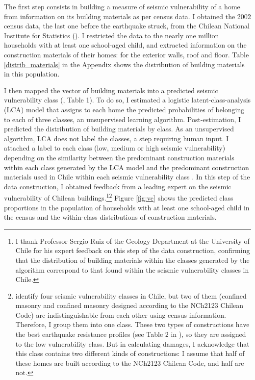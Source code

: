  

The first step consists in building a measure of seismic vulnerability of a home from information on its building materials as per census data. I obtained the 2002 census data, the last one before the earthquake struck, from the Chilean National Institute for Statistics (\cite{ine_censo_2002}). I restricted the data to the nearly one million households with at least one school-aged child, and extracted information on the construction materials of their homes: for the exterior walls, roof and floor. Table \ref{distrib_materials} in the Appendix shows the distribution of building materials in this population.\par 
 I then mapped the vector of building materials into a predicted seismic vulnerability class (\cite{grunthal1998european}, Table 1). To do so, I estimated a logistic latent-class-analysis (LCA) model that assigns to each home the predicted probabilities of belonging to each of three classes, an unsupervised learning algorithm. Post-estimation, I predicted the distribution of building materials by class. As an unsupervised algorithm, LCA does not label the classes, a step requiring human input. I attached a label to each class (low, medium or high seismic vulnerability) depending on the similarity between the predominant construction materials within each class generated by the LCA model and the predominant construction materials used in Chile within each seismic vulnerability class \citep{massoneintensidades}. In this step of the data construction, I obtained feedback from a leading expert on the seismic vulnerability of Chilean buildings.\footnote{I thank Professor Sergio Ruiz of the Geology Department at the University of Chile for his expert feedback on this step of the data construction, confirming that the distribution of building materials within the classes generated by the algorithm correspond to that found within the seismic vulnerability classes in Chile.}\footnote{\cite{astroza2012} identify four seismic vulnerability classes in Chile, but two of them (confined masonry and confined masonry designed according to the NCh2123 Chilean Code) are indistinguishable from each other using census information. Therefore, I group them into one class. These two types of constructions have the best earthquake resistance profiles (see Table 2 in \cite{astroza2012}), so they are assigned to the low vulnerability class. But in calculating damages, I acknowledge that this class contains two different kinds of constructions: I assume that half of these homes are built according to the NCh2123 Chilean Code, and half are not.} Figure \ref{fig:vc} shows the predicted class proportions in the population of households with at least one school-aged child in the census and the within-class distributions of construction materials.
 

